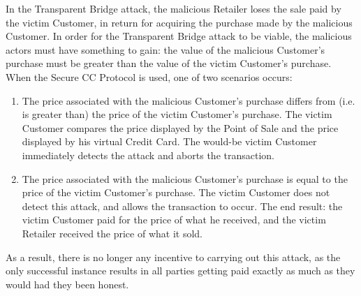In the Transparent Bridge attack, the malicious Retailer loses the sale paid by the victim Customer, in return for acquiring the purchase made by the malicious Customer.
In order for the Transparent Bridge attack to be viable, the malicious actors must have something to gain:
  the value of the malicious Customer's purchase must be greater than the value of the victim Customer's purchase.
When the Secure CC Protocol is used, one of two scenarios occurs:

\begin{enumerate}
\item The price associated with the malicious Customer's purchase differs from (i.e. is greater than) the price of the victim Customer's purchase.
The victim Customer compares the price displayed by the Point of Sale and the price displayed by his virtual Credit Card.
The would-be victim Customer immediately detects the attack and aborts the transaction.
\item The price associated with the malicious Customer's purchase is equal to the price of the victim Customer's purchase.
The victim Customer does not detect this attack, and allows the transaction to occur.
The end result: the victim Customer paid for the price of what he received, and the victim Retailer received the price of what it sold.
\end{enumerate}

As a result, there is no longer any incentive to carrying out this attack, as the only successful instance results in all parties getting paid exactly as much as they would had they been honest.
